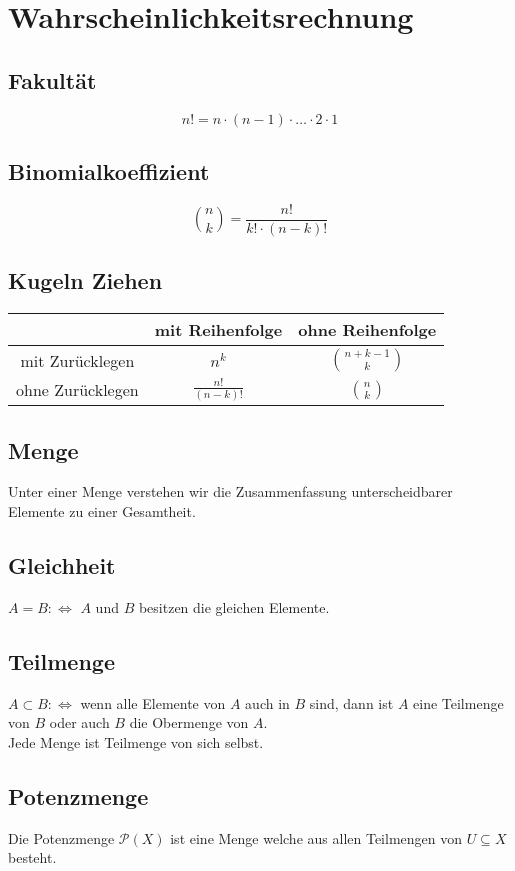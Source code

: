 \documentclass[12pt]{article}
\begin{document}
\section{Wahrscheinlichkeitsrechnung}
\subsection{Fakultät}
\begin{equation}
	n! = n \cdot (n-1) \cdot \dotsc \cdot 2 \cdot 1 
\end{equation}
\subsection{Binomialkoeffizient}
\begin{equation}
	{n \choose k} = \frac{n!}{k!\cdot(n-k)!}
\end{equation}
\subsection{Kugeln Ziehen}
\begin{tabular}{c|c|c}
	 & mit Reihenfolge & ohne Reihenfolge 
	 \\\hline
	 mit Zurücklegen & $n^k$ & ${n+k-1 \choose k}$
	 \\\hline
	 ohne Zurücklegen & $\frac{n!}{(n-k)!}$ & ${n \choose k}$
\end{tabular}
\subsection{Menge}
Unter einer Menge verstehen wir die Zusammenfassung unterscheidbarer Elemente zu einer Gesamtheit.
\subsection{Gleichheit}
$A = B:\Leftrightarrow$ $A$ und $B$ besitzen die gleichen Elemente.
\subsection{Teilmenge}
$A \subset B:\Leftrightarrow$ wenn alle Elemente von $A$ auch in $B$ sind, dann ist $A$ eine Teilmenge von $B$ oder auch $B$ die Obermenge von $A$.\\
Jede Menge ist Teilmenge von sich selbst. 
\subsection{Potenzmenge}
Die Potenzmenge $\mathcal{P}(X)$ ist eine Menge welche aus allen Teilmengen von $U \subseteq X$ besteht.
\end{document}
